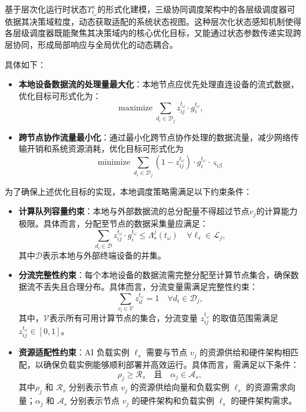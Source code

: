 基于层次化运行时状态$\Upsilon_{t_\omega}^κ$的形式化建模，三级协同调度架构中的各层级调度器可依据其决策域粒度，动态获取适配的系统状态视图。这种层次化状态感知机制使得各层级调度器既能聚焦其决策域内的核心优化目标，又能通过状态参数传递实现跨层协同，形成局部响应与全局优化的动态耦合。

具体如下：

\begin{itemize}
    \item \textbf{本地设备数据流的处理量最大化}：本地节点应优先处理直连设备的流式数据，优化目标可形式化为：
    \[
    \mathop{\text{maximize}} \sum_{d_i \in \mathcal{D}_{j}} z_{ij}^{t_\omega} \cdot g_i^{t_\omega},
    \]
    \item \textbf{跨节点协作流量最小化}：通过最小化跨节点协作处理的数据流量，减少网络传输开销和系统资源消耗，优化目标可形式化为
    \[
    \mathop{\text{minimize}} \sum_{d_i \in \mathcal{D}_j} (1 - z_{ij}^{t_\omega}) \cdot g_i^{t_\omega} \cdot \varsigma_{i\beta}
    \]
\end{itemize}
为了确保上述优化目标的实现，本地调度策略需满足以下约束条件：

\begin{itemize}
    \item \textbf{计算队列容量约束}：本地与外部数据流的总分配量不得超过节点$v_j$的计算能力极限。具体而言，分配至节点的数据采集量应满足：
    \[
    \sum_{d_i \in \mathcal{D}} z_{ij}^{t_\omega} \cdot g_i^{t_\omega} \leq \Lambda_s^j(t_\omega) \quad \forall \ell_s \in \mathcal{L}_j,
    \]
    其中$\mathcal{D}$表示本地与外部终端设备的并集。
    
    \item \textbf{分流完整性约束}：每个本地设备的数据流需完整分配至计算节点集合，确保数据流不丢失且合理分布。具体而言，分流变量需满足完整性约束：
    \[
    \sum_{v_l \in \mathcal{V}} z_{il}^{t_\omega} = 1 \quad \forall d_i \in \mathcal{D}_j,
    \]
    其中，$\mathcal{V}$表示所有可用计算节点的集合，分流变量 $z_{ij}^{t_\omega}$ 的取值范围需满足 $z_{ij}^{t_\omega} \in [0,1]$。

    \item \textbf{资源适配性约束}：AI 负载实例 $\ell_s$ 需要与节点 $v_j$ 的资源供给和硬件架构相匹配，以确保负载实例能够顺利部署并高效运行。具体而言，需满足以下条件：
    \[
    \rho_j \geq \mathcal{R}_s \quad \text{且} \quad \alpha_j \in \mathcal{A}_s,
    \]
    其中$\rho_j$ 和 $\mathcal{R}_s$ 分别表示节点 $v_j$ 的资源供给向量和负载实例 $\ell_s$ 的资源需求向量；$\alpha_j$ 和 $\mathcal{A}_s$ 分别表示节点 $v_j$ 的硬件架构和负载实例 $\ell_s$ 的硬件架构需求。
\end{itemize}

